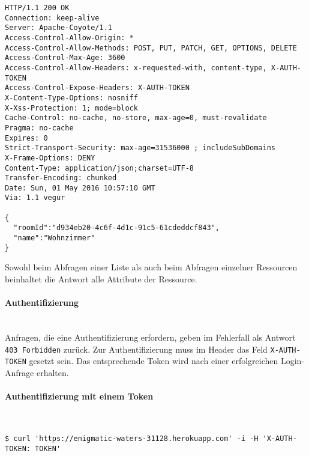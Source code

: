 \vspace{2em}
\begin{lstlisting}
HTTP/1.1 200 OK
Connection: keep-alive
Server: Apache-Coyote/1.1
Access-Control-Allow-Origin: *
Access-Control-Allow-Methods: POST, PUT, PATCH, GET, OPTIONS, DELETE
Access-Control-Max-Age: 3600
Access-Control-Allow-Headers: x-requested-with, content-type, X-AUTH-TOKEN
Access-Control-Expose-Headers: X-AUTH-TOKEN
X-Content-Type-Options: nosniff
X-Xss-Protection: 1; mode=block
Cache-Control: no-cache, no-store, max-age=0, must-revalidate
Pragma: no-cache
Expires: 0
Strict-Transport-Security: max-age=31536000 ; includeSubDomains
X-Frame-Options: DENY
Content-Type: application/json;charset=UTF-8
Transfer-Encoding: chunked
Date: Sun, 01 May 2016 10:57:10 GMT
Via: 1.1 vegur

{
  "roomId":"d934eb20-4c6f-4d1c-91c5-61cdeddcf843",
  "name":"Wohnzimmer"
}
\end{lstlisting}
\vspace{2em}

Sowohl beim Abfragen einer Liste als auch beim Abfragen einzelner Ressourcen beinhaltet die Antwort alle Attribute der Ressource.

\paragraph{Authentifizierung}\mbox{}\\
Anfragen, die eine Authentifizierung erfordern, geben im Fehlerfall als Antwort \colorbox{pregray}{\lstinline{403 Forbidden}} zurück. Zur Authentifizierung muss im Header das Feld \colorbox{pregray}{\lstinline{X-AUTH-TOKEN}} gesetzt sein. Das entsprechende Token wird nach einer erfolgreichen Login-Anfrage erhalten.

\paragraph{Authentifizierung mit einem Token}\mbox{}\\
\begin{lstlisting}
$ curl 'https://enigmatic-waters-31128.herokuapp.com' -i -H 'X-AUTH-TOKEN: TOKEN'
\end{lstlisting}

